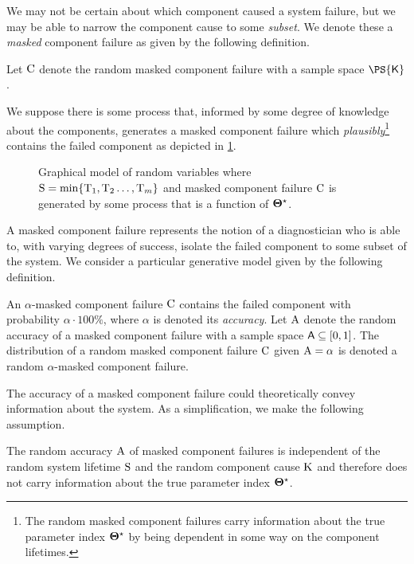 \documentclass[
    11pt,
    extrafontsizes,
    article,
    oldfontcommands,
    final,
    oneside,
    openany,
    hidelinks]{memoir}
\begin{document}
We may not be certain about which component caused a system failure, but we may be able to narrow the component cause to some \emph{subset}.
We denote these a \emph{masked} component failure as given by the following definition.
\begin{definition}
\label{def:random_candidate_set}
Let $\mathrm{C}$ denote the random masked component failure with a sample space $\PS{\Set{K}}$.
\end{definition}

We suppose there is some process that, informed by some degree of knowledge about the components, generates a masked component failure which \emph{plausibly}\footnote{The random masked component failures carry information about the true parameter index ${\boldsymbol{\Theta}}^{\star}$ by being dependent in some way on the component lifetimes.} contains the failed component as depicted in \cref{fig:gen_model}.
\begin{figure}
	\caption{Graphical model of random variables where $\mathrm{S} = \min\{\mathrm{T}_1,\mathrm{T}_2\ldots,\mathrm{T}_m\}$ and masked component failure $\mathrm{C}$ is generated by some process that is a function of ${\boldsymbol{\Theta}}^{\star}$.}
	\label{fig:gen_model}
	\begin{center}
		
	\end{center}
\end{figure}

A masked component failure represents the notion of a diagnostician who is able to, with varying degrees of success, isolate the failed component to some subset of the system.
We consider a particular generative model given by the following definition.
\begin{definition}
\label{def:rv_A}
An $\alpha$-masked component failure $\mathrm{C}$ contains the failed component with probability $\alpha \cdot 100 \%$, where $\alpha$ is denoted its \emph{accuracy}.
Let $\mathrm{A}$ denote the random accuracy of a masked component failure with a sample space $\Set{A} \subseteq [0,1]$.
The distribution of a random masked component failure $\mathrm{C}$ given $\mathrm{A} = \alpha$ is denoted a random $\alpha$-masked component failure.
\end{definition}

The accuracy of a masked component failure could theoretically convey information about the system.
As a simplification, we make the following assumption.
\begin{assumption}
\label{asm:indep_A_S_K}
The random accuracy $\mathrm{A}$ of masked component failures is independent of the random system lifetime $\mathrm{S}$ and the random component cause $\mathrm{K}$ and therefore does not carry information about the true parameter index ${\boldsymbol{\Theta}}^{\star}$.
\end{assumption}
\end{document}
